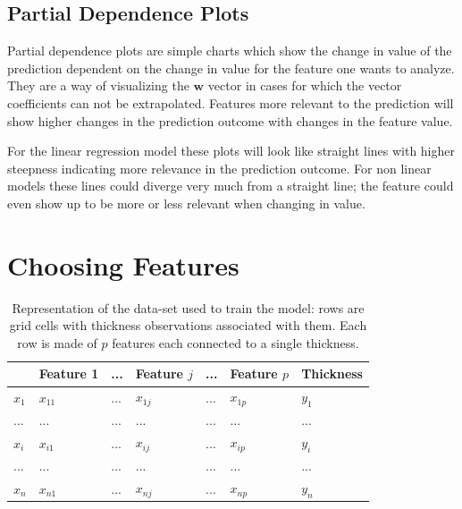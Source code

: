 \subsection{Partial Dependence Plots}
Partial dependence plots are simple charts which show the change in value of the prediction dependent on the change in value for the feature one wants to analyze. They are a way of visualizing the $\mathbf{w}$ vector in cases for which the vector coefficients can not be extrapolated. Features more relevant to the prediction will show higher changes in the prediction outcome with changes in the feature value.

For the linear regression model these plots will look like straight lines with higher steepness indicating more relevance in the prediction outcome. For non linear models these lines could diverge very much from a straight line; the feature could even show up to be more or less relevant when changing in value.  

\section{Choosing Features}\label{features}

\begin{table}
	\centering
	\caption{Representation of the data-set used to train the model: rows are grid cells with thickness observations associated with them. Each row is made of $p$ features each connected to a single thickness.}
	\label{tab:features}
	\begin{tabular}{|l|l|l|l|l|l|l|} 
		\cline{2-7}
		\multicolumn{1}{l|}{} & Feature 1 & ... & Feature $j$ & ... & Feature $p$ & Thickness \\  
		\hline
		$x_1$              & $x_{11}$ & ... & $x_{1j}$     & ... & $x_{1p}$     & $y_1$ \\   
		\hline
		...                   & ...       & ... & ...           & ... & ...           & ...    \\     
		\hline
		$x_i$              & $x_{i1}$ & ... & $x_{ij}$     & ... & $x_{ip}$     & $y_i$    \\
		\hline
		...                   & ...       & ... & ...           & ... & ...           & ...  \\       
		\hline
		$x_n$              & $x_{n1}$ & ... & $x_{nj}$     & ... & $x_{np}$     & $y_n$   \\      
		\hline
	\end{tabular}
\end{table}


